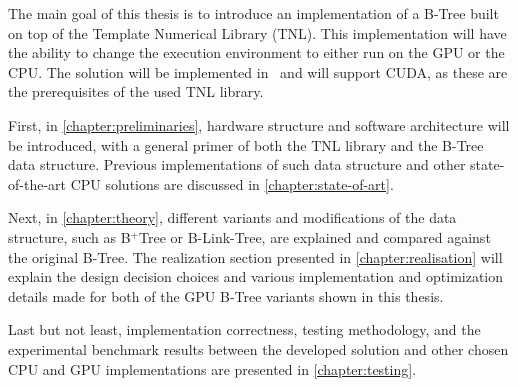 The main goal of this thesis is to introduce an implementation of a B-Tree built on top of the Template Numerical Library (TNL). This implementation will have the ability to change the execution environment to either run on the GPU or the CPU. The solution will be implemented in \CC\ and will support CUDA, as these are the prerequisites of the used TNL library.

First, in \cref{chapter:preliminaries}, hardware structure and software architecture will be introduced, with a general primer of both the TNL library and the B-Tree data structure. Previous implementations of such data structure and other state-of-the-art CPU solutions are discussed in \cref{chapter:state-of-art}. 

Next, in \cref{chapter:theory}, different variants and modifications of the data structure, such as B$^+$Tree or B-Link-Tree, are explained and compared against the original B-Tree. The realization section presented in \cref{chapter:realisation} will explain the design decision choices and various implementation and optimization details made for both of the GPU B-Tree variants shown in this thesis.

Last but not least, implementation correctness, testing methodology, and the experimental benchmark results between the developed solution and other chosen CPU and GPU implementations are presented in \cref{chapter:testing}.